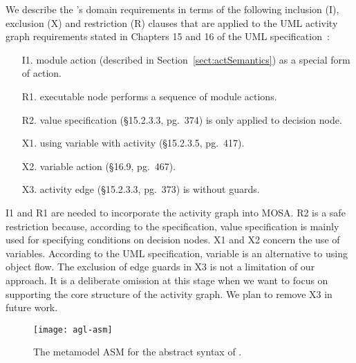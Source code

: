 We describe the \agl's domain requirements in terms of the following inclusion (I), exclusion (X) and restriction (R) clauses that are applied to the UML activity graph requirements stated in Chapters 15 and 16 of the UML specification~\cite{omg_unified_2015}:

\begin{itemize}%
	\item[I1.] module action (described in Section~\ref{sect:actSemantics}) as a special form of action.
	\item[R1.] executable node performs a sequence of module actions.
	\item[R2.] value specification (\S{15.2.3.3}, pg.~374) is only applied to decision node.
	\item[X1.] using variable with activity (\S{15.2.3.5}, pg.~417).
	\item[X2.] variable action (\S{16.9}, pg.~467).
  \item[X3.] activity edge (\S{15.2.3.3}, pg.~373) is without guards.
\end{itemize}

I1 and R1 are needed to incorporate the activity graph into MOSA. R2 is a safe restriction because, according to the specification, value specification is mainly used for specifying conditions on decision nodes. X1 and X2 concern the use of variables. According to the UML specification, variable is an alternative to using object flow. The exclusion of edge guards in X3 is not a limitation of our approach. It is a deliberate omission at this stage when we want to focus on supporting the core structure of the activity graph. We plan to remove X3 in future work.
%
%
\begin{figure*}[ht]
	\begin{center}
		\texttt{[image: agl-asm]}
	\end{center}
	\caption{The metamodel ASM for the abstract syntax of \agl.} %
	\label{fig:agl-abstractSyntax}
\end{figure*}


